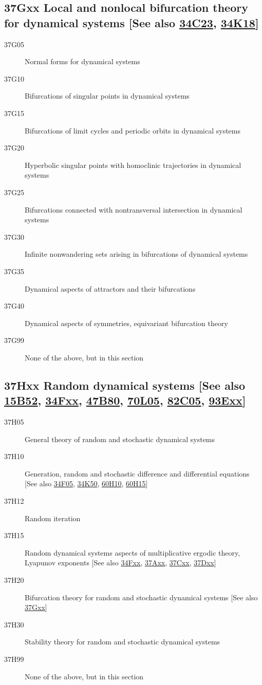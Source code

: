 \documentclass[letterpaper]{article}
\begin{document}
\subsection*{37Gxx  Local and nonlocal bifurcation theory for dynamical systems [See also \hyperref[34C23]{34C23}, \hyperref[34K18]{34K18}] }\label{37Gxx}
\begin{description}  
\item [37G05]\label{37G05} Normal forms for dynamical systems
\item [37G10]\label{37G10} Bifurcations of singular points in dynamical systems
\item [37G15]\label{37G15} Bifurcations of limit cycles and periodic orbits in dynamical systems
\item [37G20]\label{37G20} Hyperbolic singular points with homoclinic trajectories in dynamical systems
\item [37G25]\label{37G25} Bifurcations connected with nontransversal intersection in dynamical systems
\item [37G30]\label{37G30} Infinite nonwandering sets arising in bifurcations of dynamical systems
\item [37G35]\label{37G35} Dynamical  aspects of attractors and their bifurcations 
\item [37G40]\label{37G40} Dynamical  aspects of symmetries, equivariant bifurcation theory
\item [37G99]\label{37G99} None of the above, but in this section
\end{description}
\subsection*{37Hxx  Random dynamical systems [See also \hyperref[15B52]{15B52}, \hyperref[34Fxx]{34Fxx}, \hyperref[47B80]{47B80}, \hyperref[70L05]{70L05}, \hyperref[82C05]{82C05}, \hyperref[93Exx]{93Exx}] }\label{37Hxx}
\begin{description} 
\item [37H05]\label{37H05} General theory of random and stochastic dynamical systems 
\item [37H10]\label{37H10} Generation, random and stochastic difference and differential equations [See also \hyperref[34F05]{34F05}, \hyperref[34K50]{34K50}, \hyperref[60H10]{60H10}, \hyperref[60H15]{60H15}]
\item [37H12]\label{37H12} Random iteration 
\item [37H15]\label{37H15} Random dynamical systems aspects of multiplicative ergodic theory, Lyapunov exponents [See also \hyperref[34Fxx]{34Fxx}, \hyperref[37Axx]{37Axx}, \hyperref[37Cxx]{37Cxx}, \hyperref[37Dxx]{37Dxx}]
\item [37H20]\label{37H20} Bifurcation theory for random and stochastic dynamical systems [See also \hyperref[37Gxx]{37Gxx}]
\item [37H30]\label{37H30} Stability theory  for random and stochastic dynamical systems 
\item [37H99]\label{37H99} None of the above, but in this section
\end{description}
\end{document}
